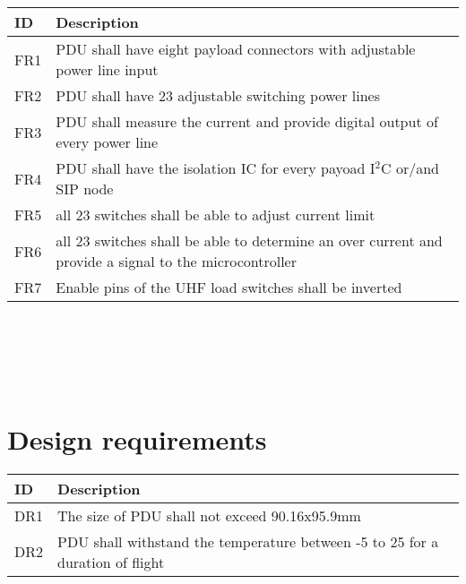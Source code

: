 \begin{tabular}{p{1cm}p{15cm}} \toprule
	ID & Description \\ \midrule
FR1 & PDU shall have eight payload connectors with adjustable power line input\\
FR2 & PDU shall have 23 adjustable switching power lines\\
FR3 & PDU shall measure the current and provide digital output of every power line\\
FR4 & PDU shall have the isolation IC for every payoad I$^2$C or/and SIP node\\
FR5 &  all 23 switches shall be able to adjust current limit\\
FR6 & all 23 switches shall be able to determine an over current and provide a signal to the microcontroller\\
FR7 & Enable pins of the UHF load switches shall be inverted\\
\bottomrule
\end{tabular}\\ \\ \\ \\
\label{Tab:req2}

\section{Design requirements}

\begin{tabular}{p{1cm}p{15cm}} \toprule
	ID & Description \\ \midrule
DR1 & The size of PDU shall not exceed 90.16x95.9mm\\
DR2 & PDU shall withstand the temperature between -5 to 25 for a duration of flight\\  
\bottomrule
\end{tabular}\\ \\ \\ \\
\label{Tab:req3}



